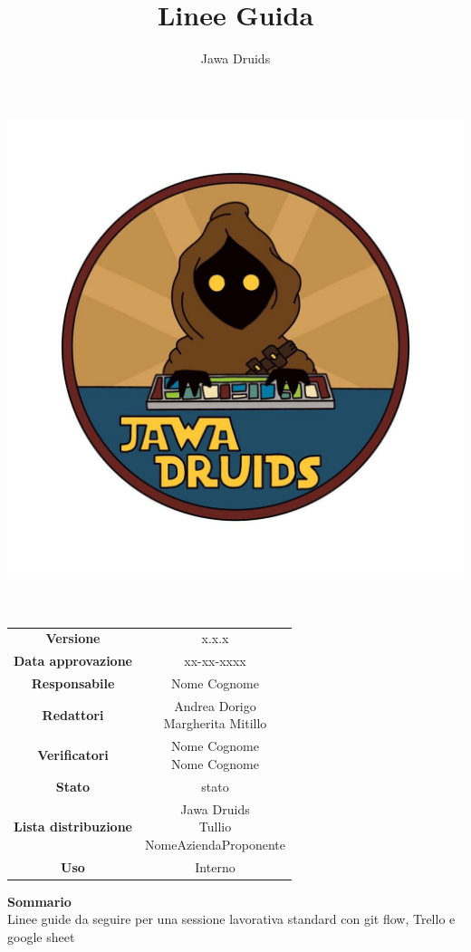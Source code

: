 \documentclass[a4paper,12pt]{report}
\begin{document}
    
\makeatletter
\begin{titlepage}
    \begin{center}
    \vspace*{-4,0cm}
    \author{Jawa Druids} 
    \title{Linee Guida}
    \date{} %
    \includegraphics[width=0.7\linewidth]{../immagini/DRUIDSLOGO.jpg}\\[4ex]
    {\huge \bfseries  \@title }\\[2ex] 
    {\LARGE  \@author}\\[50ex]
    \vspace*{-8,0cm}
    \begin{table}[H]
        \centering
        \begin{tabular}{c|c}
            \textbf{Versione} & x.x.x \\
            \textbf{Data approvazione} & xx-xx-xxxx\\
            \textbf{Responsabile} & Nome Cognome\\
            \textbf{Redattori} & \makecell{Andrea Dorigo \\ Margherita Mitillo} \\
            \textbf{Verificatori} & \makecell{Nome Cognome \\ Nome Cognome} \\
            \textbf{Stato} & stato\\
            \textbf{Lista distribuzione} & \makecell{Jawa Druids \\ Tullio \\ NomeAziendaProponente}\\
            \textbf{Uso} & Interno            
        \end{tabular}
    \end{table}
    \fontsize{16}{10}\textbf{Sommario} \\
    Linee guide da seguire per una sessione lavorativa standard con git flow, Trello e google sheet
    \end{center}
\end{titlepage}
\makeatother
\end{document}
